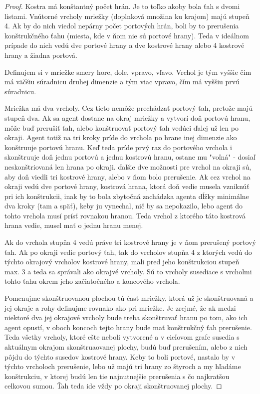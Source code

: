 \begin{proof}
Kostra má konštantný počet hrán. Je to toľko akoby bola ťah s dvomi listami.
Vnútorné vrcholy mriežky (doplnková množina ku krajom) majú stupeň 4. Ak by
do nich viedol nepárny počet portových hrán, boli by to prerušenia
konštrukčného ťahu (miesta, kde v ňom nie sú portové hrany). Teda v ideálnom
prípade do nich vedú dve portové hrany a dve kostrové hrany alebo 4 kostrové
hrany a žiadna portová.

Definujem si v mriežke smery hore, dole, vpravo, vľavo. Vrchol je tým vyššie
čím má väčšiu súradnicu druhej dimenzie a tým viac vpravo, čím má vyššiu
prvú súradnicu.

Mriežka má dva vrcholy. Cez tieto nemôže prechádzať portový ťah, pretože
majú stupeň dva. Ak sa agent dostane na okraj mriežky a vytvorí doň portovú
hranu, môže buď prerušiť ťah, alebo konštruovať portový ťah vedúci ďalej už
len po okraji. Agent totiž na tri kroky príde do vrchola po hrane inej
dimenzie ako konštruuje portovú hranu. Keď teda príde prvý raz do portového
vrchola i skonštruuje doň jednu portovú a jednu kostrovú hranu, ostane mu
"voľná" - dosiaľ neskonštriovaná len hrana po okraji. ďalšie dve možnosti
pre vrchol na okraji sú, aby doň viedli tri kostrové hrany, alebo v ňom bolo
prerušenie. Ak cez vrchol na okraji vedú dve portové hrany, kostrová hrana,
ktorá doň vedie musela vzniknúť pri ich konštrukcii, inak by to bola
zbytočná zachádzka agenta dĺžky minimálne dva kroky (tam a späť), keby ju
vynechal, nič by sa nepokazilo, lebo agent do tohto vrchola musí prísť
rovnakou hranou. Teda vrchol z ktorého táto kostrová hrana vedie, musel mať
o jednu hranu menej.

Ak do vrchola stupňa 4 vedú práve tri kostrové hrany je v ňom prerušený portový
ťah. Ak po okraji vedie portový ťah, tak do vrcholov stupňa 4 z ktorých vedú do
týchto okrajový vrcholov kostrové hrany, mali pred jeho konštrukciou stupeň
max. 3 a teda sa správali ako okrajvé vrcholy. Sú to vrcholy susediace s
vrcholmi tohto ťahu okrem jeho začiatočného a koncového vrchola.

Pomenujme skonštruovanou plochou tú časť mriežky, ktorá už je skonštruovaná
a jej okraje a rohy definujme rovnako ako pri mriežke. Je zrejmé, že ak
medzi niektoré dva jej okrajové vrcholy bude treba skonštruvať hranu po tom,
ako ich agent opustí, v oboch koncoch tejto hrany bude mať konštrukčný ťah 
prerušenie. Teda všetky vrcholy, ktoré ešte neboli vytvorené a v cieľovom
grafe susedia s aktuálnym okrajom skonštruaovanej plochy, budú buď
prerušením, alebo z nich pôjdu do týchto susedov kostrové hrany. Keby to
boli portové, nastalo by v týchto vrcholoch prerušenie, lebo už majú tri
hrany zo štyroch a my hľadáme konštrukciu, v ktorej budú len tie
najnutnejšie prerušenia s čo najkratšou celkovou sumou. Ťah teda ide vždy po
okraji skonštruovanej plochy.


\end{proof}
